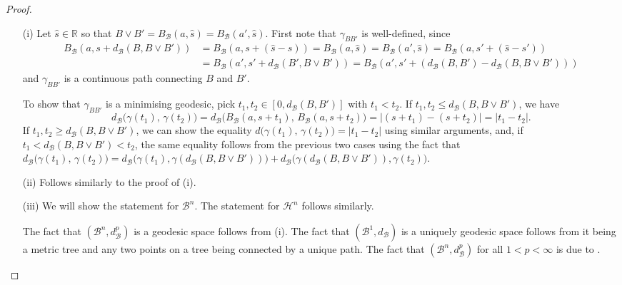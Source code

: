 \documentclass[10pt]{article}
\theoremstyle{definition}
\newcommand{\RR}{\mathbb{R}}
\begin{document}
\begin{proof}\
  \begin{enumerate}
  \item[(i)] Let $\hat s\in \RR$ so that $B\vee B'=B_\mathcal{B}(a,\hat s)=B_\mathcal{B}(a',\hat s)$.  First note that $\gamma_{BB'}$ is well-defined, since
    \begin{align*}
      B_{\mathcal{B}}(a,s+d_{\mathcal{B}}(B,B\vee B')) & = B_{\mathcal{B}}(a,s+(\hat s-s)) = B_{\mathcal{B}}(a,\hat s) = B_{\mathcal{B}}(a',\hat s) = B_{\mathcal{B}}(a,s'+(\hat s-s')) \\
      & = B_{\mathcal{B}}(a',s'+d_{\mathcal{B}}(B',B\vee B')) = B_{\mathcal{B}}(a',s'+(d_{\mathcal{B}}(B,B')-d_{\mathcal{B}}(B,B\vee B')))
    \end{align*}
    and $\gamma_{BB'}$ is a continuous path connecting $B$ and $B'$.

    To show that $\gamma_{BB'}$ is a minimising geodesic, pick $t_1,t_2\in [0,d_{\mathcal{B}}(B,B')]$ with $t_1<t_2$.  If $t_1,t_2\leq d_{\mathcal{B}}(B,B\vee B')$, we have
    \begin{equation*}
      d_{\mathcal{B}}\big(\gamma(t_1),\, \gamma(t_2)\big) = d_{\mathcal{B}}\big(B_{\mathcal{B}}(a, s + t_1),\, B_{\mathcal{B}}(a, s + t_2)\big) = \big|(s + t_1) - (s + t_2 )\big| = |t_1-t_2|.
    \end{equation*}
    If $t_1,t_2\geq d_{\mathcal{B}}(B,B\vee B')$, we can show the equality $d\big(\gamma(t_1),\, \gamma(t_2)\big)=|t_1-t_2|$ using similar arguments, and, if $t_1<d_{\mathcal{B}}(B,B\vee B')<t_2$, the same equality follows from the previous two cases using the fact that $d_{\mathcal{B}}\big(\gamma(t_1),\, \gamma(t_2)\big) = d_{\mathcal{B}}\big(\gamma(t_1),\gamma(d_{\mathcal{B}}(B,B\vee B'))\big) + d_{\mathcal{B}}\big(\gamma(d_{\mathcal{B}}(B,B\vee B')),\gamma(t_2)\big)$.
  \item[(ii)] Follows similarly to the proof of (i).
  \item[(iii)] We will show the statement for $\mathcal B^n$.  The statement for $\mathcal H^n$ follows similarly.

    The fact that $(\mathcal B^n,d_{\mathcal{B}}^p)$ is a geodesic space follows from (i).  The fact that  $(\mathcal B^1,d_{\mathcal{B}})$ is a uniquely geodesic space follows from it being a metric tree and any two points on a tree being connected by a unique path.
    The fact that $(\mathcal B^n,d_{\mathcal{B}}^p)$ for all $1<p<\infty$ is due to \cite[Proposition 3.1 (2)]{Lang2013}. \qedhere
  \end{enumerate}
\end{proof}
\end{document}

